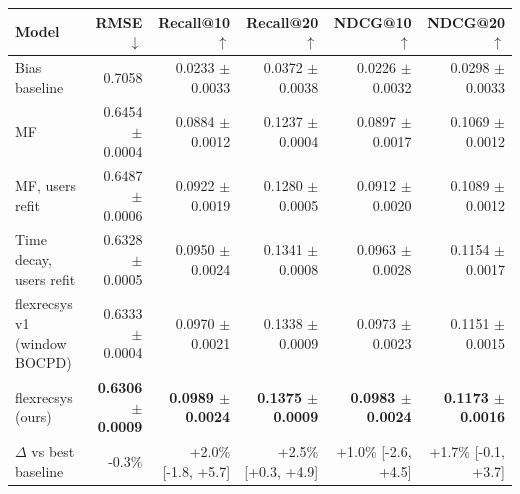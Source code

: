 \begin{tabular}{lrrrrr}
\toprule
Model & RMSE $\downarrow$ & Recall@10 $\uparrow$ & Recall@20 $\uparrow$ & NDCG@10 $\uparrow$ & NDCG@20 $\uparrow$ \\
\midrule
Bias baseline & 0.7058 & 0.0233 $\pm$ 0.0033 & 0.0372 $\pm$ 0.0038 & 0.0226 $\pm$ 0.0032 & 0.0298 $\pm$ 0.0033 \\
MF & 0.6454 $\pm$ 0.0004 & 0.0884 $\pm$ 0.0012 & 0.1237 $\pm$ 0.0004 & 0.0897 $\pm$ 0.0017 & 0.1069 $\pm$ 0.0012 \\
MF, users refit & 0.6487 $\pm$ 0.0006 & 0.0922 $\pm$ 0.0019 & 0.1280 $\pm$ 0.0005 & 0.0912 $\pm$ 0.0020 & 0.1089 $\pm$ 0.0012 \\
Time decay, users refit & 0.6328 $\pm$ 0.0005 & 0.0950 $\pm$ 0.0024 & 0.1341 $\pm$ 0.0008 & 0.0963 $\pm$ 0.0028 & 0.1154 $\pm$ 0.0017 \\
flexrecsys v1 (window BOCPD) & 0.6333 $\pm$ 0.0004 & 0.0970 $\pm$ 0.0021 & 0.1338 $\pm$ 0.0009 & 0.0973 $\pm$ 0.0023 & 0.1151 $\pm$ 0.0015 \\
flexrecsys (ours) & \textbf{0.6306 $\pm$ 0.0009} & \textbf{0.0989 $\pm$ 0.0024} & \textbf{0.1375 $\pm$ 0.0009} & \textbf{0.0983 $\pm$ 0.0024} & \textbf{0.1173 $\pm$ 0.0016} \\
\midrule
$\Delta$ vs best baseline & -0.3\% & +2.0\% [-1.8, +5.7] & +2.5\% [+0.3, +4.9] & +1.0\% [-2.6, +4.5] & +1.7\% [-0.1, +3.7] \\
\bottomrule
\end{tabular}
